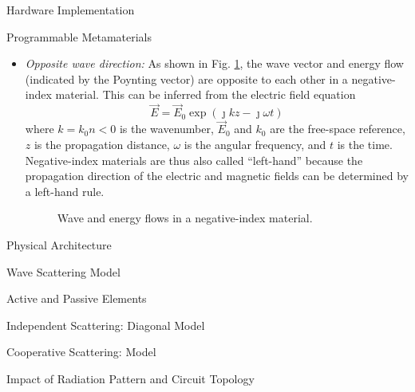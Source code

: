 \begin{section}{}
\begin{subsection}{Hardware Implementation}
\begin{subsubsection}{Programmable Metamaterials}
\begin{itemize}
				\item \emph{Opposite wave direction:} As shown in Fig. \ref{fg:nim_flows}, the wave vector and energy flow (indicated by the Poynting vector) are opposite to each other in a negative-index material. This can be inferred from the electric field equation
				\begin{equation}
					\vec{E} = \vec{E}_0 \exp(\jmath k z - \jmath \omega t)
				\end{equation}
				where $k = k_0 n < 0$ is the wavenumber, $\vec{E}_0$ and $k_0$ are the free-space reference, $z$ is the propagation distance, $\omega$ is the angular frequency, and $t$ is the time.
				Negative-index materials are thus also called ``left-hand'' because the propagation direction of the electric and magnetic fields can be determined by a left-hand rule.
				\begin{figure}[H]
					\centering
					\resizebox{0.5\columnwidth}{!}{
						
					}
					\caption{Wave and energy flows in a negative-index material.}
					\label{fg:nim_flows}
				\end{figure}
			\end{itemize}
		\end{subsubsection}

		\begin{subsubsection}{Physical Architecture}

		\end{subsubsection}
	\end{subsection}

	\begin{subsection}{Wave Scattering Model}
		\begin{subsubsection}{Active and Passive Elements}

		\end{subsubsection}

		\begin{subsubsection}{Independent Scattering: Diagonal Model}

		\end{subsubsection}

		\begin{subsubsection}{Cooperative Scattering:  Model}

		\end{subsubsection}

		\begin{subsubsection}{Impact of Radiation Pattern and Circuit Topology}

		\end{subsubsection}
	\end{subsection}


\end{section}
